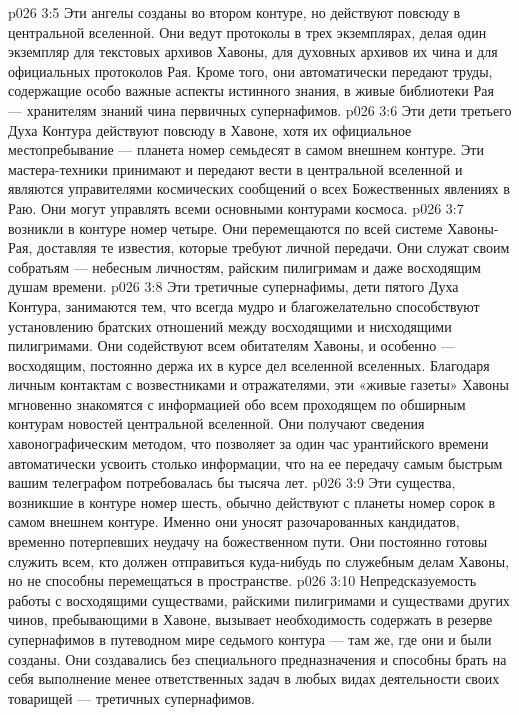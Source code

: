 \vs p026 3:5 \pc {}\bibnobreakspace {} Эти ангелы созданы во втором контуре, но действуют повсюду в центральной вселенной. Они ведут протоколы в трех экземплярах, делая один экземпляр для текстовых архивов Хавоны, для духовных архивов их чина и для официальных протоколов Рая. Кроме того, они автоматически передают труды, содержащие особо важные аспекты истинного знания, в живые библиотеки Рая --- хранителям знаний чина первичных супернафимов.
\vs p026 3:6 \pc {}\bibnobreakspace {} Эти дети третьего Духа Контура действуют повсюду в Хавоне, хотя их официальное местопребывание --- планета номер семьдесят в самом внешнем контуре. Эти мастера\hyp{}техники принимают и передают вести в центральной вселенной и являются управителями космических сообщений о всех Божественных явлениях в Раю. Они могут управлять всеми основными контурами космоса.
\vs p026 3:7 \pc {}\bibnobreakspace {} возникли в контуре номер четыре. Они перемещаются по всей системе Хавоны\hyp{}Рая, доставляя те известия, которые требуют личной передачи. Они служат своим собратьям --- небесным личностям, райским пилигримам и даже восходящим душам времени.
\vs p026 3:8 \pc {}\bibnobreakspace {} Эти третичные супернафимы, дети пятого Духа Контура, занимаются тем, что всегда мудро и благожелательно способствуют установлению братских отношений между восходящими и нисходящими пилигримами. Они содействуют всем обитателям Хавоны, и особенно --- восходящим, постоянно держа их в курсе дел вселенной вселенных. Благодаря личным контактам с возвестниками и отражателями, эти «живые газеты» Хавоны мгновенно знакомятся с информацией обо всем проходящем по обширным контурам новостей центральной вселенной. Они получают сведения хавонографическим методом, что позволяет за один час урантийского времени автоматически усвоить столько информации, что на ее передачу самым быстрым вашим телеграфом потребовалась бы тысяча лет.
\vs p026 3:9 \pc {}\bibnobreakspace {} Эти существа, возникшие в контуре номер шесть, обычно действуют с планеты номер сорок в самом внешнем контуре. Именно они уносят разочарованных кандидатов, временно потерпевших неудачу на божественном пути. Они постоянно готовы служить всем, кто должен отправиться куда\hyp{}нибудь по служебным делам Хавоны, но не способны перемещаться в пространстве.
\vs p026 3:10 \pc {}\bibnobreakspace {} Непредсказуемость работы с восходящими существами, райскими пилигримами и существами других чинов, пребывающими в Хавоне, вызывает необходимость содержать в резерве супернафимов в путеводном мире седьмого контура --- там же, где они и были созданы. Они создавались без специального предназначения и способны брать на себя выполнение менее ответственных задач в любых видах деятельности своих товарищей --- третичных супернафимов.
